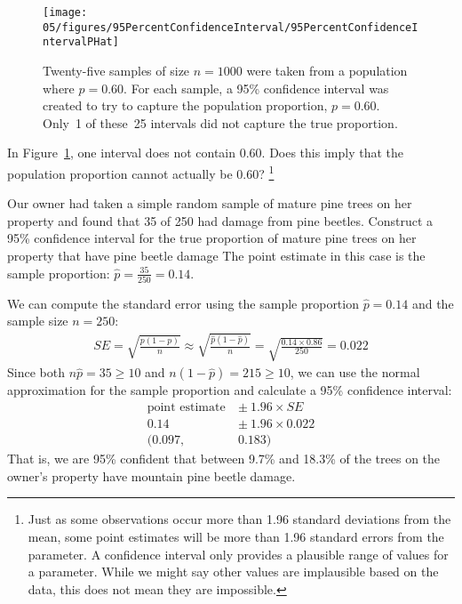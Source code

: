 \begin{figure}[hht]
   \centering
   \texttt{[image: 05/figures/95PercentConfidenceInterval/95PercentConfidenceIntervalPHat]}
   \caption{Twenty-five samples of size $n=1000$ were taken from a population where $p = 0.60$. For each sample, a 95\% confidence interval was created to try to capture the population proportion, $p = 0.60$. Only~1 of these~25 intervals did not capture the true proportion.}
   \label{95PercentConfidenceIntervalPHat}
\end{figure}

\begin{exercise}
In Figure~\ref{95PercentConfidenceIntervalPHat}, one interval does not contain 0.60. Does this imply that the population proportion cannot actually be 0.60? \footnote{Just as some observations occur more than 1.96 standard deviations from the mean, some point estimates will be more than 1.96 standard errors from the parameter. A confidence interval only provides a plausible range of values for a parameter. While we might say other values are implausible based on the data, this does not mean they are impossible.}
\end{exercise}

\begin{example}{Our owner had taken a simple random sample of mature pine trees on her property and found that 35 of 250 had damage from pine beetles. Construct a 95\% confidence interval for the true proportion of mature pine trees on her property that have pine beetle damage}\label{95CIForPineBeetleExampleForPropertyOwner}
The point estimate in this case is the sample proportion: $\hat{p} = \frac{35}{250} = 0.14$.

We can compute the standard error using the sample proportion $\hat{p} = 0.14$ and the sample size $n = 250$:
\begin{align*}
SE
	= \sqrt{\frac{p(1-p)}{n}}
	\approx \sqrt{\frac{\hat{p}(1-\hat{p})}{n}}
	= \sqrt{\frac{0.14 \times 0.86}{250}}
	= 0.022
\end{align*}
Since both $n\hat{p} = 35 \geq 10$ and $n(1-\hat{p}) = 215 \geq 10$, we can use the normal approximation for the sample proportion and calculate a 95\% confidence interval:
\begin{align*}
\text{point estimate}\ &\pm\ 1.96\times SE \\
0.14 &\pm\ 1.96\times 0.022 \\
(0.097,& 0.183)
\end{align*}
That is, we are 95\% confident that between 9.7\% and 18.3\% of the trees on the owner's property have mountain pine beetle damage.
\end{example}

